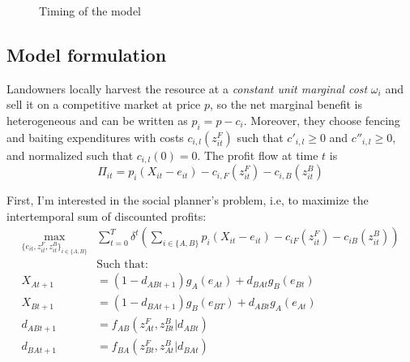 \documentclass{article}
\begin{document}
\begin{figure}[H]
  \centering
  \caption{Timing of the model}
  \label{fig:timing}
\end{figure}

\subsection{Model formulation}
Landowners locally harvest the resource at a \textit{constant unit marginal cost} $\omega_i$ and sell it on a competitive market at price $p$, so the net marginal benefit is heterogeneous and can be written as $p_i = p - c_i$. Moreover, they choose fencing and baiting expenditures with costs $c_{i,l}(z_{it}^F)$ such that $c'_{i,l}\geq 0$ and $c''_{i,l} \geq 0$, and normalized such that $c_{i,l}(0) = 0$. The profit flow at time $t$ is
\begin{equation}
    \Pi_{it} = p_i(X_{it} - e_{it}) - c_{i,F}(z_{it}^F) - c_{i,B}(z_{it}^B)
\end{equation}

First, I'm interested in the social planner's problem, i.e, to maximize the intertemporal sum of discounted profits:
\begin{align*}
    \max_{\{e_{it}, z_{it}^F, z_{it}^B \}_{i \in \{A,B\}}} & \sum_{t=0}^T \delta^t \left( \sum_{i \in \{A,B\}} p_i(X_{it} - e_{it}) - c_{iF}(z_{it}^F) - c_{iB}(z_{it}^B) \right)\\
     &\text{Such that:}\\
        X_{At+1} &= (1-d_{ABt+1})g_A(e_{At})+d_{BAt}g_B(e_{Bt})
    \\
    X_{Bt+1} &= (1 - d_{BAt+1})g_B(e_{BT}) + d_{ABt}g_A(e_{At})\\
     d_{ABt+1} &= f_{AB}(z^F_{At}, z^B_{Bt}| d_{ABt}) \\
    d_{BAt+1} &= f_{BA}(z^F_{Bt}, z^B_{At}| d_{BAt})
\end{align*}
\end{document}
